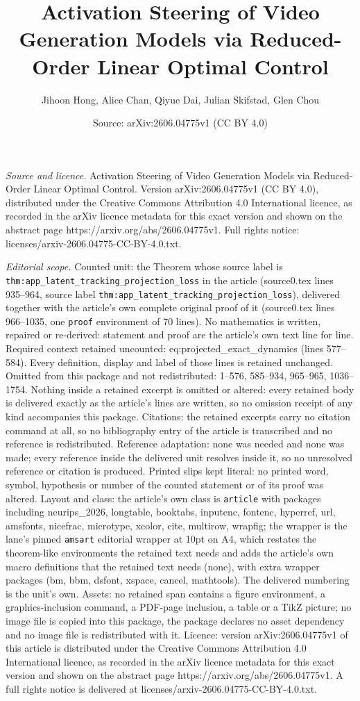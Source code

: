 \documentclass[10pt,a4paper]{amsart}
\title[Activation Steering of Video Generation Models via Reduced-O]{Activation Steering of Video Generation Models via Reduced-Order Linear Optimal Control}
\author{Jihoon Hong, Alice Chan, Qiyue Dai, Julian Skifstad, Glen Chou}
\date{Source: arXiv:2606.04775v1 (CC BY 4.0)}
\begin{document}
\maketitle

\noindent\emph{Source and licence.} Activation Steering of Video Generation Models via Reduced-Order Linear Optimal Control. Version arXiv:2606.04775v1 (CC BY 4.0), distributed under the Creative Commons Attribution 4.0 International licence, as recorded in the arXiv licence metadata for this exact version and shown on the abstract page https://arxiv.org/abs/2606.04775v1. Full rights notice: licenses/arxiv-2606.04775-CC-BY-4.0.txt.\par\smallskip

\noindent\textit{Editorial scope.} Counted unit: the Theorem whose source label is \texttt{thm:app\_latent\_tracking\_projection\_loss} in the article (source0.tex lines 935--964, source label \texttt{thm:app\_latent\_tracking\_projection\_loss}), delivered together with the article's own complete original proof of it (source0.tex lines 966--1035, one \texttt{proof} environment of 70 lines). No mathematics is written, repaired or re-derived: statement and proof are the article's own text line for line. Required context retained uncounted: eq:projected\_exact\_dynamics (lines 577--584). Every definition, display and label of those lines is retained unchanged. Omitted from this package and not redistributed: 1--576, 585--934, 965--965, 1036--1754. Nothing inside a retained excerpt is omitted or altered: every retained body is delivered exactly as the article's lines are written, so no omission receipt of any kind accompanies this package. Citations: the retained excerpts carry no citation command at all, so no bibliography entry of the article is transcribed and no reference is redistributed. Reference adaptation: none was needed and none was made; every reference inside the delivered unit resolves inside it, so no unresolved reference or citation is produced. Printed slips kept literal: no printed word, symbol, hypothesis or number of the counted statement or of its proof was altered. Layout and class: the article's own class is \texttt{article} with packages including neurips\_2026, longtable, booktabs, inputenc, fontenc, hyperref, url, amsfonts, nicefrac, microtype, xcolor, cite, multirow, wrapfig; the wrapper is the lane's pinned \texttt{amsart} editorial wrapper at 10pt on A4, which restates the theorem-like environments the retained text needs and adds the article's own macro definitions that the retained text needs (none), with extra wrapper packages (bm, bbm, dsfont, xspace, cancel, mathtools). The delivered numbering is the unit's own. Assets: no retained span contains a figure environment, a graphics-inclusion command, a PDF-page inclusion, a table or a TikZ picture; no image file is copied into this package, the package declares no asset dependency and no image file is redistributed with it. Licence: version arXiv:2606.04775v1 of this article is distributed under the Creative Commons Attribution 4.0 International licence, as recorded in the arXiv licence metadata for this exact version and shown on the abstract page https://arxiv.org/abs/2606.04775v1. A full rights notice is delivered at licenses/arxiv-2606.04775-CC-BY-4.0.txt. 
\end{document}
